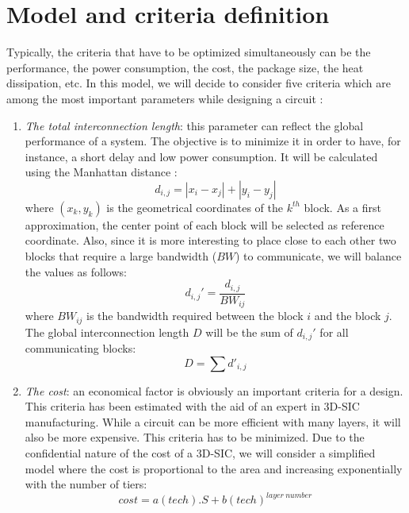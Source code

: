 \section{Model and criteria definition}
\label{sec:crit}

Typically, the criteria that have to be optimized simultaneously can be the performance, the power consumption, the cost, the package size, the heat dissipation, etc. In this model, we will decide to consider five criteria which are among the most important parameters while designing a circuit \cite{DBLP:conf/3dic/MilojevicCCRRSAPM09}:
\begin{enumerate}
\item \textit{The total interconnection length}: this parameter can reflect the global performance of a system. The objective is to minimize it in order to have, for instance, a short delay and low power consumption. It will be calculated using the Manhattan distance \cite{mandist06}:
\begin{equation}
d_{i,j}=|x_i-x_j|+|y_i-y_j|
\end{equation}
where $(x_k, y_k)$ is the geometrical coordinates of the $k^{th}$ block. As a first approximation, the center point of each block will be selected as reference coordinate. Also, since it is more interesting to place close to each other two blocks that require a large bandwidth ($BW$) to communicate, we will balance the values as follows:
\begin{equation}
d_{i,j}'=\frac{d_{i,j}}{BW_{ij}}
\end{equation}
where $BW_{ij}$ is the bandwidth required between the block $i$ and the block $j$. The global interconnection length $D$ will be the sum of $d_{i,j}'$ for all communicating blocks:
\begin{equation}
D=\sum d'_{i,j}
\end{equation}
\item \textit{The cost}: an economical factor is obviously an important criteria for a design. This criteria has been estimated with the aid of an expert in 3D-SIC manufacturing. While a circuit can be more efficient with many layers, it will also be more expensive. This criteria has to be minimized. Due to the confidential nature of the cost of a 3D-SIC, we will consider a simplified model where the cost is proportional to the area and increasing exponentially with the number of tiers:
\begin{equation}
cost=a(tech).S+b(tech)^{layer~number}
\label{eqn:cost}
\end{equation}

\end{enumerate}
